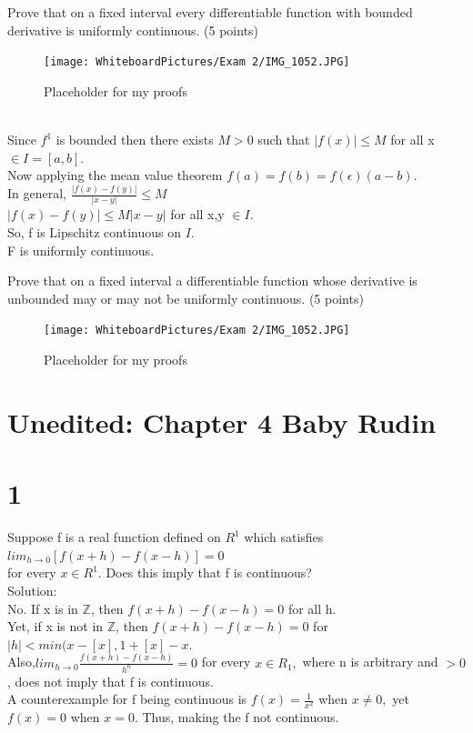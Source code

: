 Prove that on a fixed interval every differentiable function with bounded derivative is uniformly continuous. (5 points)  

\begin{figure}[h]\begin{center}\texttt{[image: WhiteboardPictures/Exam 2/IMG\_1052.JPG]}
\caption{Placeholder for my proofs} \label{fig:Euler_pic}\end{center}\end{figure} 

\\ 
Since $f^1$ is bounded then there exists $M>0$ such that $|f(x)|\leq M$ for all x $\in I=[a,b].$ \\ 
Now applying the mean value theorem $f(a)=f(b)=f(\epsilon)(a-b).$ \\ 
In general, $\frac{|f(x)-f(y)|}{|x-y|} \leq M$ \\ 
$|f(x)-f(y)| \leq M|x-y|$ for all x,y $\in I.$ \\ 
So, f is Lipschitz continuous on $I.$ \\ 
F is uniformly continuous. 


\newpage 
Prove that on a fixed interval a differentiable function whose derivative is unbounded may or may not be uniformly continuous. (5 points) 

\begin{figure}[h]\begin{center}\texttt{[image: WhiteboardPictures/Exam 2/IMG\_1052.JPG]}
\caption{Placeholder for my proofs} \label{fig:Euler_pic}\end{center}\end{figure} 


\section{Unedited: Chapter 4 Baby Rudin}
\section*{1}
Suppose f is a real function defined on $R^1$ which satisfies $lim_{h \longrightarrow 0}[f(x+h)-f(x-h)]=0$ \\ for every $x \in R^1.$ Does this imply that f is continuous? \\ 
Solution: \\ 
No. If x is in $\mathbb{Z}$, then $f(x+h)-f(x-h)= 0$ for all h. \\ 
Yet, if x is not in $\mathbb{Z}$, then $f(x+h)-f(x-h)=0$ for $|h| < min(x-[x],1+[x]-x$. \\ Also,$lim_{h \longrightarrow 0} \frac{f(x+h)-f(x-h)}{h^n}=0$ for every $x \in R_1,$ where n is arbitrary and $>0$, does not imply that f is continuous. \\ 
A counterexample for f being continuous is $f(x)=\frac{1}{x^2}$ when $x\neq 0,$ yet $f(x)=0$ when $x=0.$ Thus, making the f not continuous. 
 \\ 

